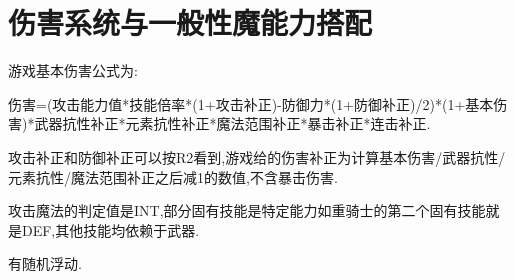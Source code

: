 
\newpage

\section{伤害系统与一般性魔能力搭配}

游戏基本伤害公式为:

伤害=(攻击能力值*技能倍率*(1+攻击补正)-防御力*(1+防御补正)/2)*(1+基本伤害)*武器抗性补正*元素抗性补正*魔法范围补正*暴击补正*连击补正.

攻击补正和防御补正可以按R2看到,游戏给的伤害补正为计算基本伤害/武器抗性/元素抗性/魔法范围补正之后减1的数值,不含暴击伤害.

攻击魔法的判定值是INT,部分固有技能是特定能力如重骑士的第二个固有技能就是DEF,其他技能均依赖于武器.

有随机浮动.

